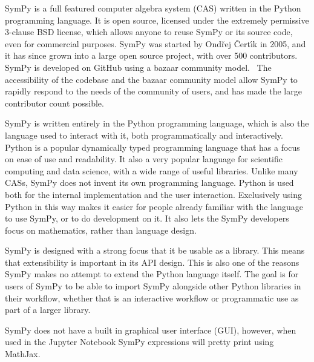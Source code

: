 SymPy is a full featured computer algebra system (CAS) written in the Python
programming language. It is open source, licensed under the extremely
permissive 3-clause BSD license, which allows anyone to reuse SymPy or its
source code, even for commercial purposes. SymPy was started by Ond\v{r}ej
\v{C}ert\'{\i}k in 2005, and it has since grown into a large open source
project, with over 500 contributors. SymPy is developed on GitHub using a
bazaar community model.~\cite{raymond1999cathedral} The accessibility of the
codebase and the bazaar community model allow SymPy to rapidly respond to the
needs of the community of users, and has made the large contributor count
possible.

SymPy is written entirely in the Python programming language,
which is also the language used to interact with it, both programmatically and
interactively. Python is a popular dynamically typed programming language that
has a focus on ease of use and readability. It also a very popular language
for scientific computing and data science, with a wide range of useful
libraries.
Unlike many CASs, SymPy does not invent its own programming language. Python
is used both for the internal implementation and the user interaction.
Exclusively using Python in this way makes it easier for people already
familiar with the language to use SymPy, or to do development on it. It also
lets the SymPy developers focus on mathematics, rather than language design.

SymPy is designed with a strong focus that it be usable as a library. This
means that extensibility is important in its API design. This is also one of
the reasons SymPy makes no attempt to extend the Python language itself. The
goal is for users of SymPy to be able to import SymPy alongside other Python
libraries in their workflow, whether that is an interactive workflow or
programmatic use as part of a larger library.

SymPy does not have a built in graphical user interface (GUI), however, when
used in the Jupyter Notebook
SymPy expressions will pretty print using MathJax.
